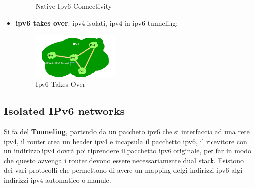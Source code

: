 \documentclass[12pt]{article}
\begin{document}
\begin{itemize}
\begin{figure}[H]
            \caption{Native Ipv6 Connectivity}
            \label{fig:native-ipv6-connectivity}
        \end{figure}
    \item \textbf{ipv6 takes over}: ipv4 isolati, ipv4 in ipv6 tunneling;
        \begin{figure}[H]
            \centering
            \includegraphics[width=0.4\textwidth]{ipv6-takes-over.png}
            \caption{Ipv6 Takes Over}
            \label{fig:ipv6-takes-over}
        \end{figure}
\end{itemize}


\subsection{Isolated IPv6 networks}
Si fa del \textbf{Tunneling}, partendo da un paccheto ipv6 che si interfaccia ad una rete ipv4, il router crea un header ipv4 e incapsula il pacchetto ipv6, il ricevitore con un indirizzo ipv4 dovr\`a poi riprendere il pacchetto ipv6 originale, per far in modo che questo avvenga i router devono essere necessariamente dual stack. Esistono dei vari protocolli che permettono di avere un mapping delgi indirizzi ipv6 algi indirizzi ipv4 automatico o manule.
\end{document}
